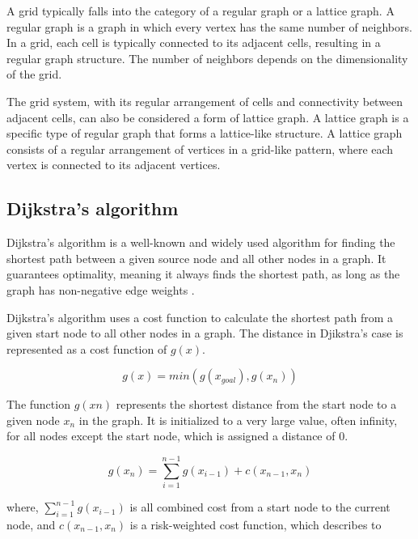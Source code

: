 \documentclass[12pt]{report}
\begin{document}
        A grid typically falls into the category of a regular graph or a lattice graph. A regular graph is a graph in
        which every vertex has the same number of neighbors. In a grid, each cell is typically connected to its adjacent
        cells, resulting in a regular graph structure. The number of neighbors depends on the dimensionality of the
        grid.
            
        The grid system, with its regular arrangement of cells and connectivity between adjacent cells, can also be
        considered a form of lattice graph. A lattice graph is a specific type of regular graph that forms a
        lattice-like structure. A lattice graph consists of a regular arrangement of vertices in a grid-like pattern,
        where each vertex is connected to its adjacent vertices.

        \subsection{Dijkstra's algorithm}
        Dijkstra's algorithm is a well-known and widely used algorithm for finding the shortest path between a given
        source node and all other nodes in a graph. It guarantees optimality, meaning it always finds the shortest path,
        as long as the graph has non-negative edge weights \cite{dijkstra_note_2022}.

        Dijkstra's algorithm uses a cost function to calculate the shortest path from a given start node to all other
        nodes in a graph. The distance in Djikstra's case is represented as a cost function of \(g(x)\).

        \begin{equation}
            g(x)=min(g(x_{goal}),g(x_n))
        \end{equation}

        The function \(g(xn)\) represents the shortest distance from the start node to a given node \(x_n\) in the
        graph. It is initialized to a very large value, often infinity, for all nodes except the start node, which is
        assigned a distance of 0.
        
        \begin{equation}\label{eq:costfunction}
            g(x_n)=\sum_{i=1}^{n-1}g(x_{i-1})+c(x_{n-1},x_n)
        \end{equation}

        where, $\sum_{i=1}^{n-1} g(x_{i-1})$ is all combined cost from a start node to the current node, and $c(x_{n-1},
        x_n)$ is a risk-weighted cost function, which describes to
\end{document}
